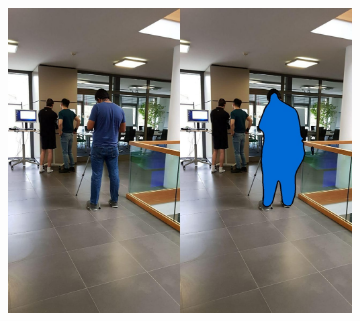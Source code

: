 \begin{figure}[!htbp]
\begin{multicols}{2}
    \begin{subfigure}[b]{\columnwidth}
            \centering
            \includegraphics[width=\textwidth]{./figures/dmn_app/samples/6.png}
    \end{subfigure}
    

\end{multicols}
\end{figure}

